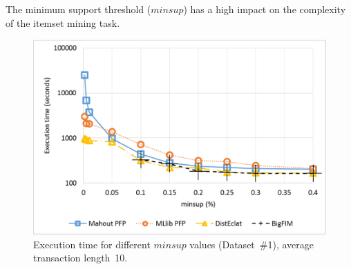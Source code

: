 The minimum support threshold ($minsup$) has a high impact on the complexity of
the itemset mining task. 





\begin{figure}[!t]
\includegraphics[width=5in]{minsup_1_log.eps}
\caption{Execution time for different $minsup$ values
(Dataset~\#1), average transaction length~10.}
\label{minsup_1}
\end{figure}



